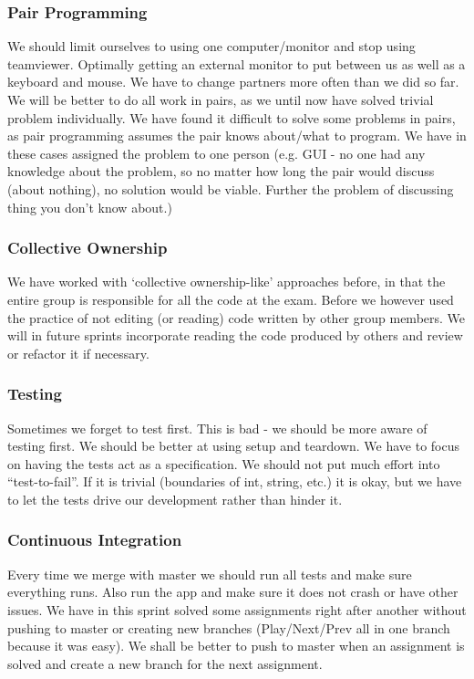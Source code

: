 \subsubsection{Pair Programming}
We should limit ourselves to using one computer/monitor and stop using teamviewer. Optimally getting an external monitor to put between us as well as a keyboard and mouse.
We have to change partners more often than we did so far.
We will be better to do all work in pairs, as we until now have solved trivial problem individually.
We have found it difficult to solve some problems in pairs, as pair programming assumes the pair knows about/what to program. We have in these cases assigned the problem to one person (e.g. GUI - no one had any knowledge about the problem, so no matter how long the pair would discuss (about nothing), no solution would be viable. Further the problem of discussing thing you don’t know about.)

\subsubsection{Collective Ownership}
We have worked with ‘collective ownership-like’ approaches before, in that the entire group is responsible for all the code at the exam.
Before we however used the practice of not editing (or reading) code written by other group members.
We will in future sprints incorporate reading the code produced by others and review or refactor it if necessary.

\subsubsection{Testing}
Sometimes we forget to test first. This is bad - we should be more aware of testing first.
We should be better at using setup and teardown.
We have to focus on having the tests act as a specification. We should not put much effort into “test-to-fail”. If it is trivial (boundaries of int, string, etc.) it is okay, but we have to let the tests drive our development rather than hinder it.

\subsubsection{Continuous Integration}
Every time we merge with master we should run all tests and make sure everything runs. Also run the app and make sure it does not crash or have other issues.
We have in this sprint solved some assignments right after another without pushing to master or creating new branches (Play/Next/Prev all in one branch because it was easy). We shall be better to push to master when an assignment is solved and create a new branch for the next assignment.
